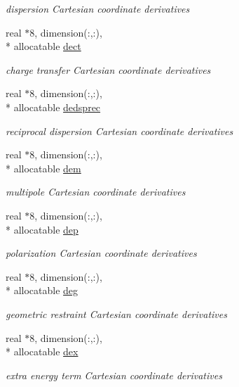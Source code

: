 \begin{DoxyCompactItemize}
\begin{DoxyCompactList}\small\item\em dispersion Cartesian coordinate derivatives \end{DoxyCompactList}\item 
real $\ast$8, dimension(\-:,\-:), \\*
allocatable \hyperlink{classderiv_a7b4ac4c0cf2f11b15f089149b9755df8}{dect}
\begin{DoxyCompactList}\small\item\em charge transfer Cartesian coordinate derivatives \end{DoxyCompactList}\item 
real $\ast$8, dimension(\-:,\-:), \\*
allocatable \hyperlink{classderiv_a6ed62d8cabbb1cf18f30cf10c6aa287c}{dedsprec}
\begin{DoxyCompactList}\small\item\em reciprocal dispersion Cartesian coordinate derivatives \end{DoxyCompactList}\item 
real $\ast$8, dimension(\-:,\-:), \\*
allocatable \hyperlink{classderiv_af6b4f5f648a769701a0accf5b8c0a49a}{dem}
\begin{DoxyCompactList}\small\item\em multipole Cartesian coordinate derivatives \end{DoxyCompactList}\item 
real $\ast$8, dimension(\-:,\-:), \\*
allocatable \hyperlink{classderiv_a3d8bf98f85539e47c4fda4f9d0fd9d13}{dep}
\begin{DoxyCompactList}\small\item\em polarization Cartesian coordinate derivatives \end{DoxyCompactList}\item 
real $\ast$8, dimension(\-:,\-:), \\*
allocatable \hyperlink{classderiv_a48f5d63eb5bf79b3cc10e774b18bf06b}{deg}
\begin{DoxyCompactList}\small\item\em geometric restraint Cartesian coordinate derivatives \end{DoxyCompactList}\item 
real $\ast$8, dimension(\-:,\-:), \\*
allocatable \hyperlink{classderiv_a1151a4b1b1f0c054ae48e2c629cdd22a}{dex}
\begin{DoxyCompactList}\small\item\em extra energy term Cartesian coordinate derivatives \end{DoxyCompactList}\item 

\end{DoxyCompactItemize}
